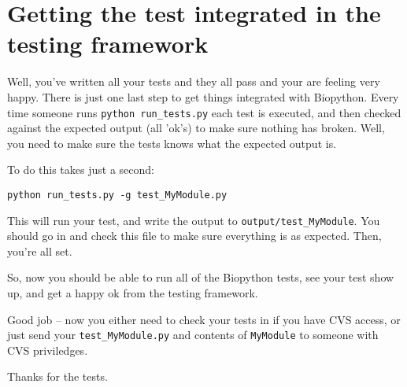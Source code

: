 \documentclass{article}
\begin{document}
\section{Getting the test integrated in the testing framework}

Well, you've written all your tests and they all pass and your are
feeling very happy. There is just one last step to get things 
integrated with Biopython. Every time someone runs 
\verb|python run_tests.py| each test is executed, and then checked
against the expected output (all 'ok's) to make sure nothing has broken.
Well, you need to make sure the tests knows what the expected output
is.

To do this takes just a second:

\begin{verbatim}
python run_tests.py -g test_MyModule.py
\end{verbatim}

This will run your test, and write the output to
\verb|output/test_MyModule|. You should go in and check this file to
make sure everything is as expected. Then, you're all set.

So, now you should be able to run all of the Biopython tests, see your
test show up, and get a happy ok from the testing framework.

Good job -- now you either need to check your tests in if you have CVS
access, or just send your \verb|test_MyModule.py| and contents of
\verb|MyModule| to someone with CVS priviledges.

Thanks for the tests.
\end{document}
